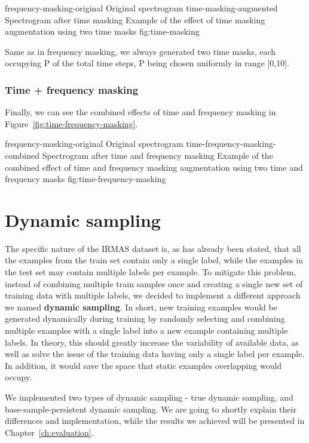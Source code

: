 \asideimages{7cm}{7cm}
	    {frequency-masking-original}
	    {Original spectrogram}
        {time-masking-augmented}
	    {Spectrogram after time masking}
	    {Example of the effect of time masking augmentation using two time masks}
	    {fig:time-masking}

Same as in frequency masking, we always generated two time masks, each occupying P of the total time steps, P being chosen uniformly in range [0,10].

\subsubsection{Time + frequency masking}

Finally, we can see the combined effects of time and frequency masking in Figure~\ref{fig:time-frequency-masking}.

\asideimages{7cm}{7cm}
	    {frequency-masking-original}
	    {Original spectrogram}
        {time-frequency-masking-combined}
	    {Spectrogram after time and frequency masking}
	    {Example of the combined effect of time and frequency masking augmentation using two time and frequency masks}
	    {fig:time-frequency-masking}

\section{Dynamic sampling}
\label{sec:data-prep:dynamic-sampling}

The specific nature of the IRMAS dataset is, as has already been stated, that all the examples from the train set contain only a single label, while the examples in the test set may contain multiple labels per example. To mitigate this problem, instead of combining multiple train samples once and creating a single new set of training data with multiple labels,  we decided to implement a different approach we named \textbf{dynamic sampling}. In short, new training examples would be generated dynamically during training by randomly selecting and combining multiple examples with a single label into a new example containing multiple labels. In theory, this should greatly increase the variability of available data, as well as solve the issue of the training data having only a single label per example. In addition, it would save the space that static examples overlapping would occupy.

We implemented two types of dynamic sampling - true dynamic sampling, and base-sample-persistent dynamic sampling. We are going to shortly explain their differences and implementation, while the results we achieved will be presented in Chapter~\ref{ch:evaluation}.

